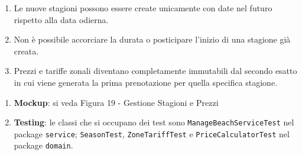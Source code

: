 \documentclass{article}
\begin{document}
	{
		\begin{enumerate}[nosep, leftmargin=*]
			\item[•] Le nuove stagioni possono essere create unicamente con date nel futuro rispetto alla data odierna.
			\item[•] Non è possibile accorciare la durata o posticipare l'inizio di una stagione già creata.
			\item[•] Prezzi e tariffe zonali diventano completamente immutabili dal secondo esatto in cui viene generata la prima prenotazione per quella specifica stagione.
		\end{enumerate}
		
		\begin{enumerate}[leftmargin=*]
			\item[•] \textbf{Mockup}: si veda Figura 19 - Gestione Stagioni e Prezzi
			
			\item[•] \textbf{Testing}: le classi che si occupano dei test sono \texttt{ManageBeachServiceTest} nel package \texttt{service}; \texttt{SeasonTest}, \texttt{ZoneTariffTest} e \texttt{PriceCalculatorTest} nel package \texttt{domain}.
		\end{enumerate}
	}
		
	\newpage
	
\end{document}
